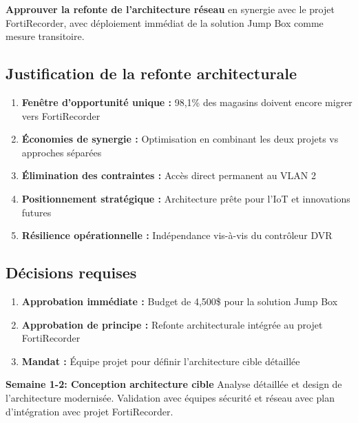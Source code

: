\documentclass{UTT-Books-44}
\begin{document}

\textbf{Approuver la refonte de l'architecture réseau} en synergie avec le projet FortiRecorder, avec déploiement immédiat de la solution Jump Box comme mesure transitoire.

\subsection{Justification de la refonte architecturale}

\begin{enumerate}
\item \textbf{Fenêtre d'opportunité unique :} 98,1\% des magasins doivent encore migrer vers FortiRecorder
\item \textbf{Économies de synergie :} Optimisation en combinant les deux projets vs approches séparées
\item \textbf{Élimination des contraintes :} Accès direct permanent au VLAN 2
\item \textbf{Positionnement stratégique :} Architecture prête pour l'IoT et innovations futures
\item \textbf{Résilience opérationnelle :} Indépendance vis-à-vis du contrôleur DVR
\end{enumerate}


\subsection{Décisions requises}

\begin{enumerate}
\item \textbf{Approbation immédiate :} Budget de 4,500\$ pour la solution Jump Box
\item \textbf{Approbation de principe :} Refonte architecturale intégrée au projet FortiRecorder
\item \textbf{Mandat :} Équipe projet pour définir l'architecture cible détaillée
\end{enumerate}


\textbf{Semaine 1-2: Conception architecture cible}
Analyse détaillée et design de l'architecture modernisée. Validation avec équipes sécurité et réseau avec plan d'intégration avec projet FortiRecorder.
\end{document}
